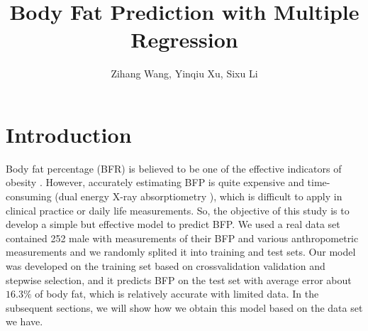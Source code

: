 \documentclass[letterpaper,10pt]{article}
\title{\textbf{Body Fat Prediction with Multiple Regression}}
\author{Zihang Wang, Yinqiu Xu, Sixu Li}
\begin{document}
\maketitle
\section{Introduction}
Body fat percentage (BFR) is believed to be one of the effective indicators of obesity \cite{relationship2015Ho}. However, accurately estimating BFP is quite expensive and time-consuming (dual energy X-ray absorptiometry \cite{anthropometric2016Lizak}), which is difficult to apply in clinical practice or daily life measurements. So, the objective of this study is to develop a simple but effective model to predict BFP. We used a real data set contained 252 male with measurements of their BFP and various anthropometric measurements and we randomly splited it into training and test sets. Our model was developed on the training set based on crossvalidation validation and stepwise selection, and it predicts BFP on the test set with average error about $16.3\%$ of body fat, which is relatively accurate with limited data. In the subsequent sections, we will show how we obtain this model based on the data set we have.
\end{document}
